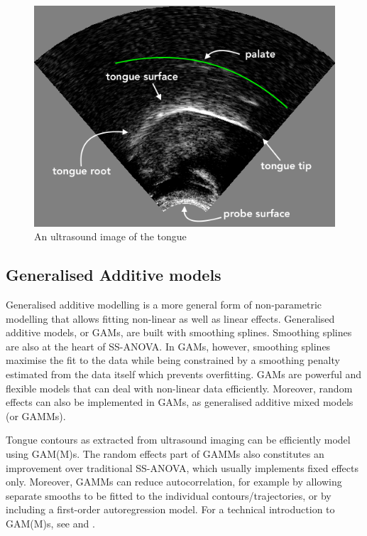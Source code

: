 \documentclass[12pt,]{article}
\begin{document}
\begin{figure}
  \centering
  \includegraphics{./img/uti.png}
  \caption{An ultrasound image of the tongue}
  \label{f:uti}
\end{figure}

\hypertarget{generalised-additive-models}{%
\subsection{Generalised Additive
models}\label{generalised-additive-models}}

Generalised additive modelling is a more general form of non-parametric
modelling that allows fitting non-linear as well as linear effects.
Generalised additive models, or GAMs, are built with smoothing splines.
Smoothing splines are also at the heart of SS-ANOVA. In GAMs, however,
smoothing splines maximise the fit to the data while being constrained
by a smoothing penalty estimated from the data itself which prevents
overfitting. GAMs are powerful and flexible models that can deal with
non-linear data efficiently. Moreover, random effects can also be
implemented in GAMs, as generalised additive mixed models (or GAMMs).

Tongue contours as extracted from ultrasound imaging can be efficiently
model using GAM(M)s. The random effects part of GAMMs also constitutes
an improvement over traditional SS-ANOVA, which usually implements fixed
effects only. Moreover, GAMMs can reduce autocorrelation, for example by
allowing separate smooths to be fitted to the individual
contours/trajectories, or by including a first-order autoregression
model. For a technical introduction to GAM(M)s, see \citet{zuur2012} and
\citet{wood2017}.
\end{document}
